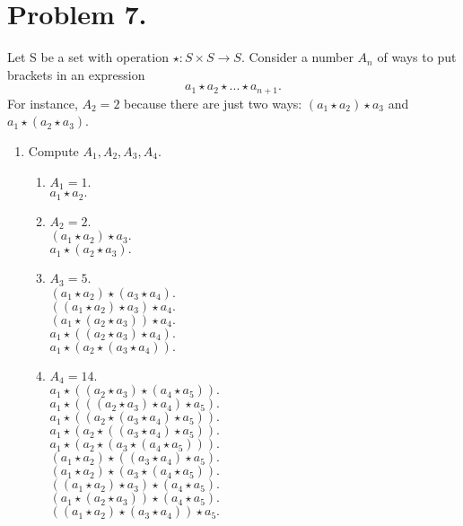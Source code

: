 \documentclass{article}
\begin{document}
\section{Problem 7.}
Let S be a set with operation $\star: S\times S\rightarrow S$. Consider a number $A_n$ of ways to put brackets in an expression
\[a_1\star a_2\star ...\star a_{n+1}.\tag{1}\label{1}\]
For instance, $A_2=2$ because there are just two ways: $(a_1\star a_2)\star a_3$ and $a_1\star (a_2\star a_3)$.
\begin{enumerate}[label=(\alph*)]
    \item Compute $A_1,A_2,A_3,A_4$. \label{a}
    \begin{enumerate}[label=(\roman*)]
        \item $A_1=1$.
        \\$a_1 \star a_2.$
        \item $A_2=2$.
        \\$(a_1\star a_2)\star a_3.$
        \\$a_1\star (a_2\star a_3).$
        \item $A_3=5$.
        \\$(a_1 \star a_2) \star (a_3 \star a_4).$
        \\$((a_1 \star a_2) \star a_3) \star a_4.$
        \\$(a_1 \star (a_2 \star a_3)) \star a_4.$
        \\$a_1 \star ((a_2 \star a_3) \star a_4).$
        \\$a_1 \star (a_2 \star (a_3 \star a_4)).$
        \item $A_4=14$.
        \\$a_1 \star ((a_2 \star a_3) \star (a_4 \star a_5)).$
        \\$a_1 \star (((a_2 \star a_3) \star a_4) \star a_5).$
        \\$a_1 \star ((a_2 \star (a_3 \star a_4) \star a_5)).$
        \\$a_1 \star (a_2 \star ((a_3 \star a_4) \star a_5)).$
        \\$a_1 \star (a_2 \star (a_3 \star (a_4 \star a_5))).$
        \\$(a_1 \star a_2) \star ((a_3 \star a_4) \star a_5).$
        \\$(a_1 \star a_2) \star (a_3 \star (a_4 \star a_5)).$
        \\$((a_1 \star a_2) \star a_3) \star (a_4 \star a_5).$
        \\$(a_1 \star (a_2 \star a_3)) \star (a_4 \star a_5).$
        \\$((a_1 \star a_2) \star (a_3 \star a_4)) \star a_5.$

\end{enumerate}
\end{enumerate}
\end{document}
